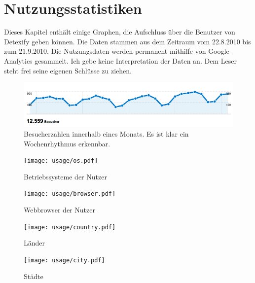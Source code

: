 \chapter{Nutzungsstatistiken} %
\label{cha:nutzungsstatistiken}

Dieses Kapitel enthält einige Graphen, die Aufschluss über die Benutzer von Detexify geben können. Die Daten stammen aus dem Zeitraum vom 22.8.2010 bis zum 21.9.2010. Die Nutzungsdaten werden permanent mithilfe von Google Analytics \cite{analytics} gesammelt. Ich gebe keine Interpretation der Daten an. Dem Leser steht frei seine eigenen Schlüsse zu ziehen.

\begin{figure}[htbp]
  \begin{center}
    \includegraphics[width=.75\textwidth]{usage/users.png}
  \end{center}
  \caption{Besucherzahlen innerhalb eines Monats. Es ist klar ein Wochenrhythmus erkennbar.}
\end{figure}

\begin{figure}[htbp]
  \begin{center}
    \texttt{[image: usage/os.pdf]}
  \end{center}
  \caption{Betriebssysteme der Nutzer}
\end{figure}

\begin{figure}[htbp]
  \begin{center}
    \texttt{[image: usage/browser.pdf]}
  \end{center}
  \caption{Webbrowser der Nutzer}
\end{figure}

\begin{figure}[htbp]
  \begin{center}
    \texttt{[image: usage/country.pdf]}
  \end{center}
  \caption{Länder}
\end{figure}

\begin{figure}[htbp]
  \begin{center}
    \texttt{[image: usage/city.pdf]}
  \end{center}
  \caption{Städte}
\end{figure}

